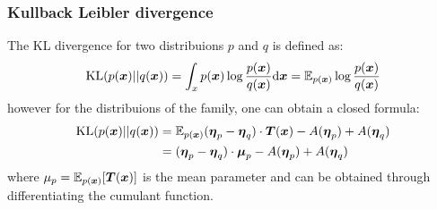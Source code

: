 \subsubsection{Kullback Leibler divergence}
The KL divergence for two distribuions $p$ and $q$ is defined as:
$$
\mathrm{KL}(p(\boldsymbol{x}) || q(\boldsymbol{x})) = \int_x p(\boldsymbol{x}) \log \frac{p(\boldsymbol{x})}{q(\boldsymbol{x})} \mbox{\rm d}\boldsymbol{x} 
= \operatorname{\mathbb{E}}_{p(\boldsymbol{x})} \log \frac{p(\boldsymbol{x})}{q(\boldsymbol{x})} 
$$
however for the distribuions of the family, one can obtain a closed formula:
\begin{align*}
    \mathrm{KL}(p(\boldsymbol{x}) || q(\boldsymbol{x})) &= \operatorname{\mathbb{E}}_{p(\boldsymbol{x})} (\boldsymbol{\eta}_p - \boldsymbol{\eta}_q) \cdot  \boldsymbol{T}(\boldsymbol{x}) - A(\boldsymbol{\eta}_p) + A(\boldsymbol{\eta}_q) \\
    &= (\boldsymbol{\eta}_p - \boldsymbol{\eta}_q) \cdot  \boldsymbol{\mu}_p - A(\boldsymbol{\eta}_p) + A(\boldsymbol{\eta}_q) \\
\end{align*}
where $\mu_p =\operatorname{\mathbb{E}}_{p(\boldsymbol{x})}[\boldsymbol{T}(\boldsymbol{x})] $ is the mean parameter and can be obtained through differentiating the cumulant function. 

